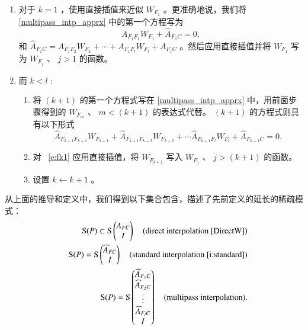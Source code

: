 \documentclass[12pt]{acta_2011xz}
\newcommand{\sparse}{\ensuremath{\operatorname{S}}}
\begin{document}
\begin{itemize}
\begin{enumerate}
    \item   对于    $k=1$    ，使用直接插值来近似
   $W_{F_1}$    。更准确地说，我们将
   \eqref{multipass_intp_apprx}    中的第一个方程写为
   $$
                    A_{F_1F_1}W_{F_1} +\hat A_{F_1C} =0,
                $$    和    $\hat A_{F_1C} =A_{F_1F_2}W_{F_2} +\cdots + A_{F_1F_l}W_{F_l}+A_{F_1C}$    。然后应用直接插值并将    $W_{F_1}$    写为    $W_{F_j}$    、    $j>1$    的函数。   \item   而    $k<l$    : 
   \begin{enumerate}      \item   将    $(k+1)$    的第一个方程式写在
   \eqref{multipass_intp_apprx}    中，用前面步骤得到的    $W_{F_m}$    、    $m < (k+1)$    的表达式代替。
   $(k+1)$    的方程式则具有以下形式
   \begin{equation}\label{e:fk1} \hat A_{F_{k+1}F_{k+1}}W_{F_{k+1}}+
\hat A_{F_{k+1}F_{k+2}}W_{F_{k+2}}+ \cdots \hat A_{F_{k+1}F_l}W_{F_l}+
\hat A_{F_{k+1}C}=0.
                \end{equation}      \item   对~    \eqref{e:fk1}    应用直接插值，将 
   $W_{F_{k+1}}$    写入 
   $W_{F_{j}}$    、    $j>(k+1)$    的函数。   \item   设置    $k\leftarrow k+1$    。  \end{enumerate}    
   \end{enumerate}     \end{itemize}     

从上面的推导和定义中，我们得到以下集合包含，描述了先前定义的延长的稀疏模式：
   \begin{eqnarray*}
&& \sparse(P) \subset 
\sparse
\begin{pmatrix}
A_{FC} \\ I
\end{pmatrix}
    \quad \mbox{(direct interpolation \eqref{DirectW})} \\ 
&& \sparse(P) = 
\sparse
\begin{pmatrix}
\widehat A_{FC} \\ 
I
\end{pmatrix}
    \quad \mbox{(standard interpolation~\eqref{i:standard})} \\ 
&& \sparse(P) = 
\sparse
\begin{pmatrix}
\widehat A_{F_1C} \\ 
\widehat A_{F_2C} \\ 
\vdots \\ 
\widehat A_{F_lC} \\ 
I
\end{pmatrix}
    \quad \mbox{(multipass interpolation)}.
\end{eqnarray*}     
\end{document}
